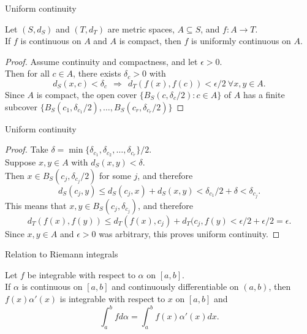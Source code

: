 \documentclass{beamer}
\begin{document}
\begin{frame}{Uniform continuity}
\begin{thm}
Let $(S,d_S)$ and $(T,d_T)$ are metric spaces, $A\subseteq S$, and $f: A\rightarrow T$.\\
If $f$ is continuous on $A$ and $A$ is compact, then $f$ is uniformly continuous on $A$.
\end{thm}
\pause
\begin{proof}
\pause
Assume continuity and compactness, and let $\epsilon > 0$.\\
\pause
Then for all $c\in A$, there exists $\delta_c > 0$ with
$$d_S(x,c) < \delta_c\ \ \Rightarrow\ \ d_T(f(x),f(c)) < \epsilon/2\ \forall x,y\in A.$$
\pause
Since $A$ is compact, the open cover $\{B_S(c,\delta_c/2): c\in A\}$ of $A$ has a finite subcover
$\{B_S(c_1,\delta_{c_1}/2),\dots,B_S(c_r,\delta_{c_r}/2)\}$
\end{proof}
\end{frame}

\begin{frame}{Uniform continuity}
\begin{proof}
\pause
Take $\delta = \min\{\delta_{c_1},\delta_{c_2},\dots,\delta_{c_r}\}/2$.\\
\pause
Suppose $x,y\in A$ with $d_S(x,y) < \delta$.\\
\pause
Then $x\in B_S(c_j,\delta_{c_j}/2)$ for some $j$, and therefore
$$d_S(c_j,y)\leq d_S(c_j,x)+d_S(x,y) < \delta_{c_1}/2 + \delta < \delta_{c_j}.$$
\pause
This means that $x,y\in B_S(c_j,\delta_{c_j})$, and therefore
$$d_T(f(x),f(y)) \leq d_T(f(x),c_j) + d_T(c_j,f(y) < \epsilon/2+\epsilon/2=\epsilon.$$
\pause
Since $x,y\in A$ and $\epsilon > 0$ was arbitrary, this proves uniform continuity.
\end{proof}
\end{frame}

\begin{frame}{Relation to Riemann integrals}
\begin{thm}
Let $f$ be integrable with respect to $\alpha$ on $[a,b]$.\\
If $\alpha$ is continuous on $[a,b]$ and continuously differentiable on $(a,b)$, then
$f(x)\alpha'(x)$ is integrable with respect to $x$ on $[a,b]$ and
$$\int_a^b f d\alpha = \int_a^bf(x)\alpha'(x)dx.$$
\end{thm}
\end{frame}
\end{document}
